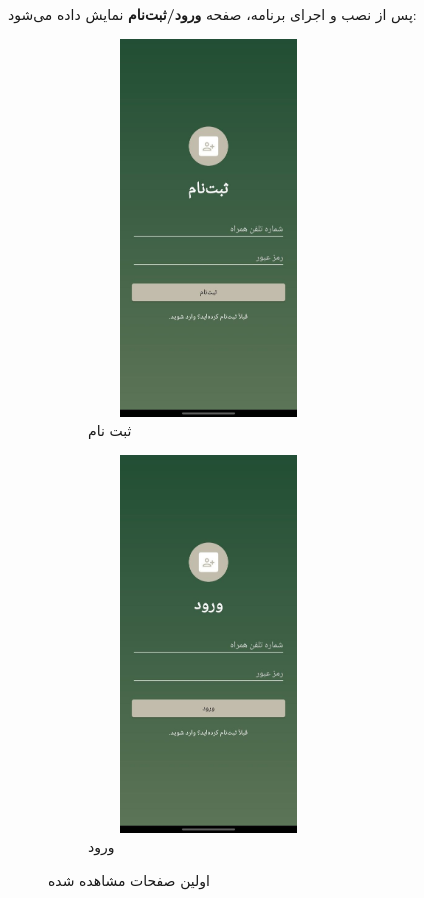 \documentclass{report}
\begin{document}
پس از نصب و اجرای برنامه، صفحه \textbf{ورود/ثبت‌نام} نمایش داده می‌شود:
\begin{figure}[ht]
	\centering
	\begin{subfigure}[b]{0.3\textwidth}\centering
		\includegraphics[width=0.7\textwidth,height=10cm,keepaspectratio]{Pic/signup}
		\caption{ثبت نام}
		\label{fig:signup}
	\end{subfigure}
	\begin{subfigure}[b]{0.3\textwidth}\centering
		\includegraphics[width=0.7\textwidth,height=10cm,keepaspectratio]{Pic/login}
		\caption{ورود}
		\label{fig:login}
	\end{subfigure}
	\caption{اولین صفحات مشاهده شده}
	\label{fig:animals}
\end{figure}
\end{document}
